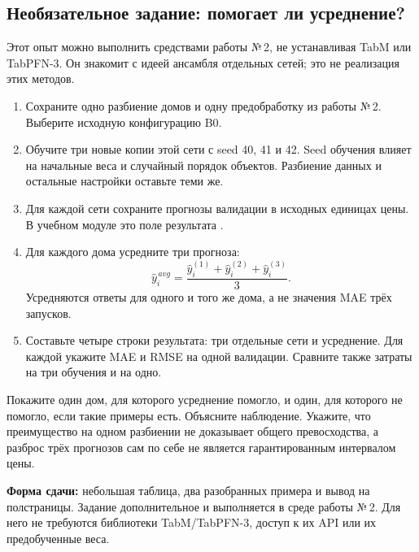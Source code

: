 \subsection*{Необязательное задание: помогает ли усреднение?}
Этот опыт можно выполнить средствами работы №\,2, не устанавливая TabM или TabPFN-3. Он знакомит с идеей ансамбля отдельных сетей; это не реализация этих методов.
\begin{enumerate}
\item Сохраните одно разбиение домов и одну предобработку из работы №\,2. Выберите исходную конфигурацию B0.
\item Обучите три новые копии этой сети с seed 40, 41 и 42. Seed обучения влияет на начальные веса и случайный порядок объектов. Разбиение данных и остальные настройки оставьте теми же.
\item Для каждой сети сохраните прогнозы валидации в исходных единицах цены. В учебном модуле это поле  результата .
\item Для каждого дома усредните три прогноза:
\[
\widehat y_i^{\,avg}=
\frac{\widehat y_i^{(1)}+\widehat y_i^{(2)}+\widehat y_i^{(3)}}{3}.
\]
Усредняются ответы для одного и того же дома, а не значения MAE трёх запусков.
\item Составьте четыре строки результата: три отдельные сети и усреднение. Для каждой укажите MAE и RMSE на одной валидации. Сравните также затраты на три обучения и на одно.
\end{enumerate}

Покажите один дом, для которого усреднение помогло, и один, для которого не помогло, если такие примеры есть. Объясните наблюдение. Укажите, что преимущество на одном разбиении не доказывает общего превосходства, а разброс трёх прогнозов сам по себе не является гарантированным интервалом цены.

\textbf{Форма сдачи:} небольшая таблица, два разобранных примера и вывод на полстраницы. Задание дополнительное и выполняется в среде работы №\,2. Для него не требуются библиотеки TabM/TabPFN-3, доступ к их API или их предобученные веса.
